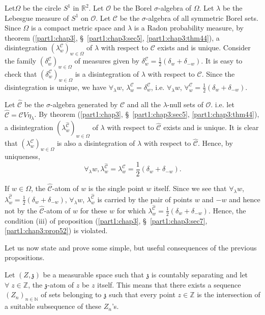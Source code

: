Let\pageoriginale $\Omega$ be the circle $S^1$ in $\mathbb{R}^2$. Let
$\mathscr{O}$ be the Borel $\sigma$-algebra of $\Omega$. Let $\lambda$
be the Lebesgue measure of $S^1$ on $\mathscr{O}$. Let $\mathscr{C}$
be the $\sigma$-algebra of all symmetric Borel sets. Since $\Omega$ is
a compact metric space and $\lambda$ is a Radon probability measure,
by theorem (\ref{part1:chap3}, \S\ \ref{part1:chap3:sec5},
\ref{part1:chap3:thm44}), a disintegration 
$(\lambda^\mathscr{C}_w)_{w \in \Omega}$ of $\lambda$ with respect to
$\mathscr{C}$ exists and is unique. Consider the family
$(\delta^\mathscr{C}_w)_{w \in \Omega}$ of measures given by
$\delta^\mathscr{C}_w = \frac{1}{2} (\delta_w + \delta_{-w})$. It is
easy to check that $(\delta^\mathscr{C}_w)_{w \in \Omega}$ is a
disintegration of $\lambda$ with respect to $\mathscr{C}$. Since the
disintegration is unique, we have $\forall_\lambda w$,
$\lambda^\mathscr{C}_w = \delta^\mathscr{C}_w$, i.e. $\forall_\lambda
w$, $\forall^\mathscr{C}_w = \frac{1}{2} (\delta_w + \delta_{-w})$. 

Let $\hat{\mathscr{C}}$ be the $\sigma$-algebra generated by
$\mathscr{C}$ and all the $\lambda$-null sets of
$\mathscr{O}$. i.e. let $\hat{\mathscr{C}} = \mathscr{C} V
\eta_\lambda$. By theorem (\ref{part1:chap3},
\S\ \ref{part1:chap3:sec5}, \ref{part1:chap3:thm44}), a disintegration 
$(\lambda^{\hat{\mathscr{C}}}_w)_{w \in \Omega}$ of $\lambda$ with
respect to $\hat{\mathscr{C}}$ exists and is unique. It is clear that
$(\lambda^\mathscr{C}_w)_{w \in \Omega}$ is also a disintegration of
$\lambda$ with respect to $\hat{\mathscr{C}}$. Hence, by uniqueness, 
$$
\forall_\lambda w, \lambda^{\hat{\mathscr{C}}}_w =
\lambda^\mathscr{C}_w = \frac{1}{2} (\delta_w + \delta_{-w}). 
$$

If $w \in \Omega$, the $\hat{\mathscr{C}}$-atom of $w$ is the single
point $w$ itself. Since we see that $\forall_\lambda w$,
$\lambda^{\hat{\mathscr{C}}}_w = \frac{1}{2} (\delta_w +
\delta_{-w})$, $\forall_\lambda w$, $\lambda^{\hat{\mathscr{C}}}_w$ is
carried by the pair of points $w$ and $-w$ and hence not by the
$\hat{\mathscr{C}}$-atom of $w$ for these $w$ for which
$\lambda^{\hat{\mathscr{C}}}_w = \frac{1}{2} (\delta_w +
\delta_{-w})$. Hence, the condition (iii) of proposition
(\ref{part1:chap3}, \S\ \ref{part1:chap3:sec7},
\ref{part1:chap3:prop52}) is violated. 

Let us now state and prove some simple, but useful consequences of the
previous propositions. 

Let $(Z, \mathfrak{z})$ be a measurable space such that $\mathfrak{z}$
is countably separating and let $\forall \; z \in \mathbb{Z}$, the
$\mathfrak{z}$-atom of $z$ be $z$ itself. This means that there exists
a sequence $(Z_n)_{n \in \mathbb{N}}$ of sets belonging to
$\mathfrak{z}$ such that every point $z \in \mathbb{Z}$ is the
intersection of a suitable subsequence of these $Z_n$'s. 

